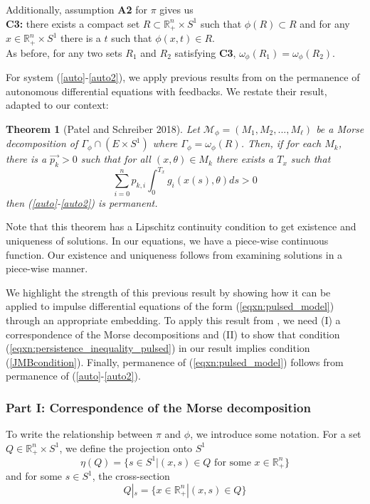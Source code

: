 \documentclass{article}
\newtheorem{theorem}{Theorem}[section]
\theoremstyle{definition}
\newcommand{\R}{{\mathbb{R}}}
\begin{document}
Additionally, assumption \textbf{A2} for $\pi$ gives us \\

\noindent \textbf{C3:} there exists a compact set $R \subset \R_+^n \times S^1$ such that $\phi(R) \subset R $ and for any $x\in \R_+^n \times S^1$ there is a $t$ such that $\phi(x,t) \in R$.  \\

As before, for any two sets $R_1$ and $R_2$ satisfying \textbf{C3}, $\omega_\phi(R_1)=\omega_\phi(R_2)$. 

For system (\ref{auto}-\ref{auto2}), we apply previous results from \cite{patel_schreiber_2018} on the permanence of autonomous differential equations with feedbacks. We restate their result, adapted to our context:

\begin{theorem}[Patel and Schreiber 2018]\label{thm:patel_schreiber_1}
    Let $\mathcal{M}_\phi = (M_1, M_2, ..., M_\ell)$ be a Morse decomposition of $\Gamma_\phi \cap (E\times S^1)$ where $\Gamma_\phi = \omega_\phi(R)$.  Then, if for each $M_k$, there is a $\vec{p_k}>0$ such that for all $(x,\theta) \in M_k$ there exists a $T_x$ such that 
    \begin{equation}\label{JMBcondition}
        \sum_{i=0}^n p_{k,i} \int_0^{T_x} g_i(x(s), \theta)ds >0 
    \end{equation}
    then (\ref{auto}-\ref{auto2}) is permanent. 
\end{theorem}

Note that this theorem has a Lipschitz continuity condition to get existence and uniqueness of solutions.  In our equations, we have a piece-wise continuous function.  Our existence and uniqueness follows from examining solutions in a piece-wise manner.

We highlight the strength of this previous result by showing how it can be applied to impulse differential equations of the form (\ref{eqxn:pulsed_model}) through an appropriate embedding.  To apply this result from \cite{patel_schreiber_2018}, we need (I) a correspondence of the Morse decompositions and (II) to show that condition (\ref{eqxn:persistence_inequality_pulsed}) in our result implies condition (\ref{JMBcondition}).  Finally, permanence of (\ref{eqxn:pulsed_model}) follows from permanence of (\ref{auto}-\ref{auto2}). 



\subsubsection{Part I: Correspondence of the Morse decomposition}
To write the relationship between $\pi$ and $\phi$, we introduce some notation.  For a set $Q \in \R_+^n \times S^1$, we define the projection onto $S^1$
$$\eta(Q) = \{ s \in S^1 | (x,s) \in Q \text{ for some } x \in \R_+^n \}$$
and for some $s\in S^1$, the cross-section 
$$
Q|_s = \{x\in \R_+^n | (x,s) \in Q \}
$$
\end{document}
